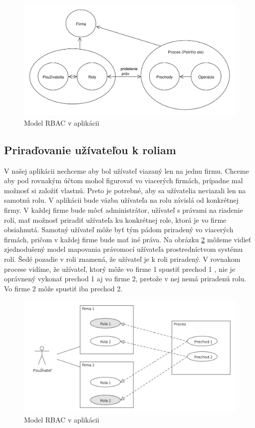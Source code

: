 	\begin{figure}[h]
		\centering
		\includegraphics[width=0.9\linewidth]{images/roles_in_petri_model}
		\caption{ Model RBAC v aplikácii}
		\label{fig:model_rbac_v_aplikacii}
	\end{figure}
	
	\subsection{Priraďovanie užívateľou k roliam}
	V našej aplikácii nechceme aby bol užívateľ viazaný len na jednu firmu. Chceme aby pod rovnakým účtom mohol figurovať vo viacerých firmách, prípadne mal možnosť si založiť vlastnú. Preto je potrebné, aby sa užívatelia neviazali len na samotnú rolu. V aplikácii bude väzba užívateľa na rolu závislá od konkrétnej firmy. V každej firme bude môcť administrátor, užívateľ s právami na riadenie rolí, mať možnosť priradiť užívateľa ku konkrétnej role, ktorá je vo firme obsiahnutá. Samotný užívateľ môže byť tým pádom priradený vo viacerých firmách, pričom v každej firme bude mať iné práva. Na obrázku  \ref{fig:user_to_roles} môžeme vidieť zjednodušený model mapovania právomocí užívateľa prostredníctvom systému rolí.
	Šedé pozadie v roli znamená, že užívateľ je k roli priradený.  V rovnakom procese vidíme, že užívateľ, ktorý môže vo firme 1 spustiť prechod 1 , nie je oprávnený vykonať prechod 1 aj vo firme 2, pretože v nej nemá priradenú rolu. Vo firme 2 môže spustiť iba prechod 2.
	
		\begin{figure}[h]
			\centering
			\includegraphics[width=0.9\linewidth]{images/user_to_roles}
			\caption{ Model RBAC v aplikácii}
			\label{fig:user_to_roles}
		\end{figure}
	
